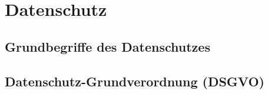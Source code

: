 \section{Datenschutz}
\subsection{Grundbegriffe des Datenschutzes}
\subsection{Datenschutz-Grundverordnung (DSGVO)}